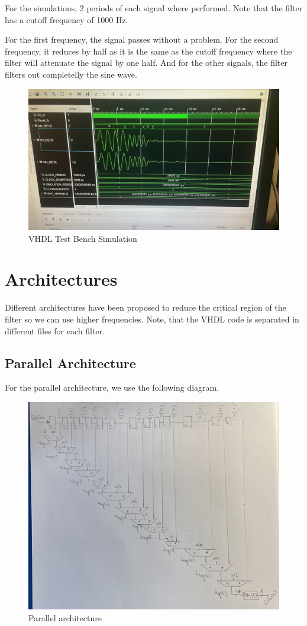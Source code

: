 \documentclass[a4paper, 12pt]{article}
\begin{document}
For the simulations, 2 periods of each signal where performed. Note that the filter has a cutoff frequency of 1000 Hz.

For the first frequency, the signal passes without a problem. For the second frequency, it reduces by half as it is the same as the cutoff frequency where the filter will attenuate the signal by one half. And for the other signals, the filter filters out completelly the sine wave.

\begin{figure}[htbp]
\centering
\includegraphics[width=.9\linewidth]{./img/simulation.jpg}
\caption{VHDL Test Bench Simulation}
\end{figure}
\section{Architectures}
\label{sec:orgdf88fcb}

Different architectures have been proposed to reduce the critical region of the filter so we can use higher frequencies. Note, that the VHDL code is separated in different files for each filter.
\subsection{Parallel Architecture}
\label{sec:org9182d6c}

For the parallel architecture, we use the following diagram.

\begin{figure}[htbp]
\centering
\includegraphics[width=.9\linewidth]{./img/architecture_parallel.jpg}
\caption{Parallel architecture}
\end{figure}
\end{document}
